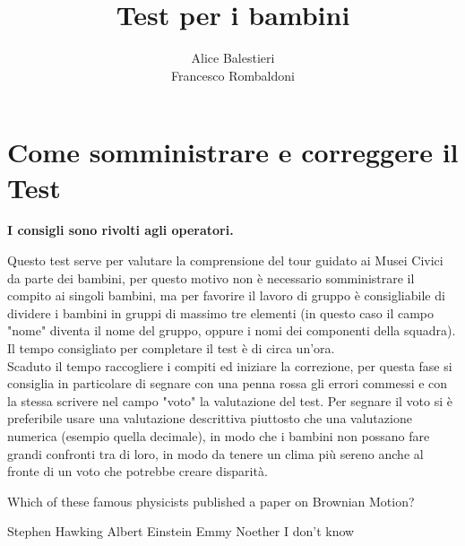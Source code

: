 \documentclass[hidelinks,12pt,a4paper]{exam}
\begin{document}
	\title{\textbf{Test per i bambini}}
	\author{Alice Balestieri\\Francesco Rombaldoni}
	\date{}
	\maketitle
	
	\newpage
	
	\tableofcontents
	\newpage
	
	\section{Come somministrare e correggere il Test}
	\begin{center}
		\textbf{I consigli sono rivolti agli operatori.}
	\end{center}
	
	Questo test serve per valutare la comprensione del tour guidato ai Musei Civici da parte dei bambini, per questo motivo non è necessario somministrare il compito ai singoli bambini, ma per favorire il lavoro di gruppo è consigliabile di dividere i bambini in gruppi di massimo tre elementi (in questo caso il campo "nome" diventa il nome del gruppo, oppure i nomi dei componenti della squadra). Il tempo consigliato per completare il test è di circa un'ora.\\
	Scaduto il tempo raccogliere i compiti ed iniziare la correzione, per questa fase si consiglia in particolare di segnare con una penna rossa gli errori commessi e con la stessa scrivere nel campo "voto" la valutazione del test. Per segnare il voto si è preferibile usare una valutazione descrittiva piuttosto che una valutazione numerica (esempio quella decimale), in modo che i bambini non possano fare grandi confronti tra di loro, in modo da tenere un clima più sereno anche al fronte di un voto che potrebbe creare disparità.
	
	
	\newpage
	
	\fboxrule=2pt
	\centerline{
	}
	
	
	\begin{questions}
		
		\question Which of these famous physicists published a paper on Brownian Motion?
		\begin{checkboxes}
			\choice Stephen Hawking 
			\CorrectChoice Albert Einstein
			\choice Emmy Noether
			\choice I don't know
		\end{checkboxes}
		
	\end{questions}
	
	\printanswers
\end{document}
